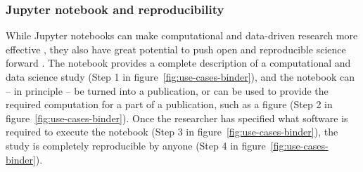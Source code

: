 %
%


\subsubsection{Jupyter notebook and reproducibility}

While Jupyter notebooks can make computational and data-driven research more effective
\cite{Perkel2018,Fangohr2020,Granger2021}, they also have great potential to push
open and reproducible science forward \cite{Beg2021}. The notebook provides a complete
description of a computational and data science study (Step 1 in
figure~\ref{fig:use-cases-binder}), and the notebook can -- in principle -- be
turned into a publication, or can be used to provide the required computation
for a part of a publication, such as a figure (Step 2 in
figure~\ref{fig:use-cases-binder}). Once the researcher has specified what
software is required to execute the notebook (Step 3 in
figure~\ref{fig:use-cases-binder}), the study is completely reproducible by
anyone (Step 4 in figure~\ref{fig:use-cases-binder}).

